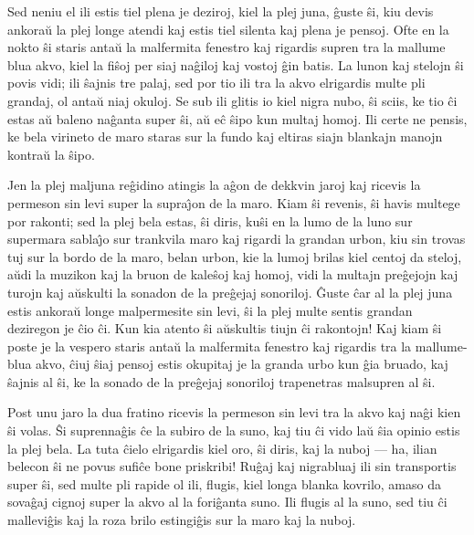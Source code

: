    Sed neniu el ili estis tiel plena je deziroj, kiel la plej juna,
\^guste \^si, kiu devis ankora\u u la plej longe atendi kaj estis
tiel silenta kaj plena je pensoj. Ofte en la nokto \^si staris
anta\u u la malfermita fenestro kaj rigardis supren tra la mallume
blua akvo, kiel la fi\^soj per siaj na\^giloj kaj vostoj \^gin
batis. La lunon kaj stelojn \^si povis vidi; ili \^sajnis tre palaj,
sed por tio ili tra la akvo elrigardis multe pli grandaj, ol anta\u
u niaj okuloj. Se sub ili glitis io kiel nigra nubo, \^si sciis, ke
tio \^ci estas a\u u baleno na\^ganta super \^si, a\u u e\^c \^sipo
kun multaj homoj. Ili certe ne pensis, ke bela virineto de maro
staras sur la fundo kaj eltiras siajn blankajn manojn kontra\u u la
\^sipo.

   Jen la plej maljuna re\^gidino atingis la a\^gon de dekkvin jaroj kaj
ricevis la permeson sin levi super la supra\^{\j}on de la maro. Kiam
\^si revenis, \^si havis multege por rakonti; sed la plej bela
estas, \^si diris, ku\^si en la lumo de la luno sur supermara
sabla\^{\j}o sur trankvila maro kaj rigardi la grandan urbon, kiu
sin trovas tuj sur la bordo de la maro, belan urbon, kie la lumoj
brilas kiel centoj da steloj, a\u udi la muzikon kaj la bruon de
kale\^soj kaj homoj, vidi la multajn pre\^gejojn kaj turojn kaj a\u
uskulti la sonadon de la pre\^gejaj sonoriloj. \^Guste \^car al la
plej juna estis ankora\u u longe malpermesite sin levi, \^si la plej
multe sentis grandan deziregon je \^cio \^ci. Kun kia atento \^si
a\u uskultis tiujn \^ci rakontojn! Kaj kiam \^si poste je la vespero
staris anta\u u la malfermita fenestro kaj rigardis tra la
mallume-blua akvo, \^ciuj \^siaj pensoj estis okupitaj je la granda
urbo kun \^gia bruado, kaj \^sajnis al \^si, ke la sonado de la
pre\^gejaj sonoriloj trapenetras malsupren al \^si.

   Post unu jaro la dua fratino ricevis la permeson sin levi tra la
akvo kaj na\^gi kien \^si volas. \^Si suprenna\^gis \^ce la subiro
de la suno, kaj tiu \^ci vido la\u u \^sia opinio estis la plej
bela. La tuta \^cielo elrigardis kiel oro, \^si diris, kaj la nuboj
--- ha, ilian belecon \^si ne povus sufi\^ce bone priskribi! Ru\^gaj
kaj nigrabluaj ili sin transportis super \^si, sed multe pli rapide
ol ili, flugis, kiel longa blanka kovrilo, amaso da sova\^gaj cignoj
super la akvo al la fori\^ganta suno. Ili flugis al la suno, sed tiu
\^ci mallevi\^gis kaj la roza brilo estingi\^gis sur la maro kaj la
nuboj.


